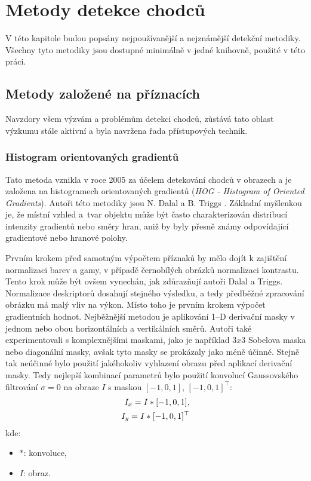\section{Metody detekce chodců}
V této kapitole budou popsány nejpoužívanější a nejznámější detekční metodiky. Všechny tyto metodiky jsou dostupné minimálně v jedné knihovně, použité v této práci.  

\subsection{Metody založené na příznacích}
Navzdory všem výzvám a problémům detekci chodců, zůstává tato oblast výzkumu stále aktivní a byla navržena řada přístupových technik.
\subsubsection*{Histogram orientovaných gradientů}
Tato metoda vznikla v roce 2005 za účelem detekování chodců v obrazech a je založena na histogramech orientovaných gradientů (\textit{HOG - Histogram of Oriented Gradients}). Autoři této metodiky jsou N. Dalal a B. Triggs \cite{hog:dalal}. Základní myšlenkou je, že místní vzhled a~tvar objektu může být často charakterizován distribucí intenzity gradientů nebo směry hran, aniž by byly přesně známy odpovídající gradientové nebo hranové polohy.  

Prvním krokem před samotným výpočtem příznaků by mělo dojít k zajištění normalizaci barev a gamy, v případě černobílých obrázků normalizaci kontrastu. Tento krok může být ovšem vynechán, jak zdůrazňují autoři Dalal a Triggs. Normalizace deskriptorů dosahují stejného výsledku, a tedy předběžné zpracování obrázku má malý vliv na výkon. Místo toho je prvním krokem výpočet gradientních hodnot. Nejběžnější metodou je aplikování 1--D derivační masky v jednom nebo obou horizontálních a vertikálních směrů. Autoři také experimentovali s komplexnějšími maskami, jako je například $3x3$ Sobelova maska nebo diagonální masky, avšak tyto masky se prokázaly jako méně účinné. Stejně tak neúčinné bylo použití jakéhokoliv vyhlazení obrazu před aplikací derivační masky. Tedy nejlepší kombinací parametrů bylo použití konvolucí Gaussovského filtrování $\sigma = 0$ na obraze $I$ s maskou $[-1, 0, 1]$, $[-1,0,1]^\top$:
\begin{equation*}
\centering
 \label{eq:hogMask}
 \begin{aligned}
I_x = I * [-1, 0, 1], \\
I_y = I * [-1, 0, 1]^\top
 \end{aligned}
\end{equation*}
kde:
\begin{itemize}[label=]
  \item $*$: konvoluce,
  \item $I$: obraz.
\end{itemize}

